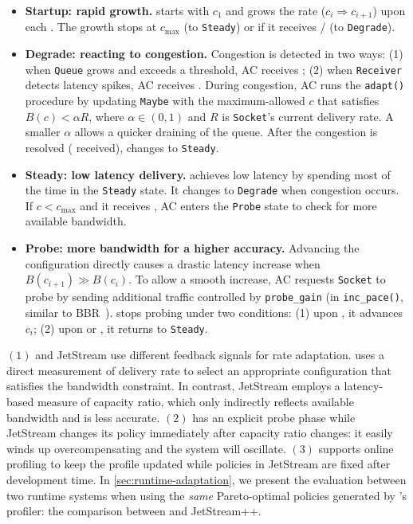 \begin{itemize}[leftmargin=*, topsep=3pt, itemsep=0pt]

\item \textbf{Startup: rapid growth.} \sysname{} starts with $c_1$ and grows the
  rate ($c_i \Rightarrow c_{i+1}$) upon each \qe{}. The growth stops at
  $c_{\max}$ (to \texttt{Steady}) or if it receives \qc{}/\rc{} (to
  \texttt{Degrade}).

\item \textbf{Degrade: reacting to congestion.} Congestion is detected in two
  ways: (1) when \texttt{Queue} grows and exceeds a threshold, AC receives
  \qc{}; (2) when \texttt{Receiver} detects latency spikes, AC receives
  \rc{}. During congestion, AC runs the \texttt{adapt()} procedure by updating
  \texttt{Maybe} with the maximum-allowed $c$ that satisfies $B(c) < \alpha R$,
  where $\alpha \in (0, 1)$ and $R$ is \texttt{Socket}'s current delivery
  rate. A smaller $\alpha$ allows a quicker draining of the queue. After the
  congestion is resolved (\qe{} received), \sysname{} changes to
  \texttt{Steady}.

\item \textbf{Steady: low latency delivery.} \sysname{} achieves low latency by
  spending most of the time in the \texttt{Steady} state. It changes to
  \texttt{Degrade} when congestion occurs. If $c < c_{\max}$ and it receives
  \qe{}, AC enters the \texttt{Probe} state to check for more available
  bandwidth.

\item \textbf{Probe: more bandwidth for a higher accuracy.} Advancing the
  configuration directly causes a drastic latency increase when
  $B(c_{i+1}) \gg B(c_i)$. To allow a smooth increase, AC requests
  \texttt{Socket} to probe by sending additional traffic controlled by
  \texttt{probe\_gain} (in \texttt{inc\_pace()}, similar to
  BBR~\cite{cardwell2017bbr}). \sysname{} stops probing under two conditions:
  (1) upon \spd{}, it advances $c_i$; (2) upon \qc{} or \rc{}, it returns to
  \texttt{Steady}.

\end{itemize}

 $(1)$ \sysname{} and JetStream
use different feedback signals for rate adaptation. \sysname{} uses a direct
measurement of delivery rate to select an appropriate configuration that
satisfies the bandwidth constraint. In contrast, JetStream employs a
latency-based measure of capacity ratio, which only indirectly reflects
available bandwidth and is less accurate. $(2)$ \sysname{} has an explicit probe
phase while JetStream changes its policy immediately after capacity ratio
changes: it easily winds up overcompensating and the system will
oscillate. 
$(3)$ \sysname{} supports online profiling to keep the profile
updated while policies in JetStream are fixed after development time. In
\autoref{sec:runtime-adaptation}, we present the evaluation between two runtime
systems when using the \textit{same} Pareto-optimal policies generated by \sysname{}'s
profiler: the comparison between
\sysname{} and JetStream++.

